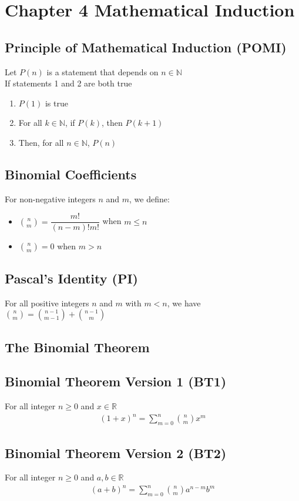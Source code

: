 \documentclass[12pt, letterpaper]{article}
\begin{document}
\section{Chapter 4 Mathematical Induction}
\subsection{Principle of Mathematical Induction (POMI)}
Let $P(n)$ is a statement that depends on $n \in \mathbb{N}$ \\
If statements 1 and 2 are both true 
\begin{enumerate}
    \item $P(1)$ is true 
    \item For all $k \in \mathbb{N}$, if $P(k)$, then $P(k+1)$
    \item Then, for all $n \in \mathbb{N}$, $P(n)$
\end{enumerate}
\subsection{Binomial Coefficients}
For non-negative integers $n$ and $m$, we define:
\begin{itemize}
    \item ${n \choose m} = \dfrac{m!}{(n-m)!m!}$ when $m \leq n$
    \item ${n \choose m} = 0$ when $m > n$
\end{itemize}
\subsection{Pascal's Identity (PI)}
For all positive integers $n$ and $m$ with $m < n$, we have \\
${n \choose m} = {{n-1} \choose {m-1}} + {{n-1} \choose m}$
\subsection{The Binomial Theorem}
\subsection{Binomial Theorem Version 1 (BT1)}
For all integer $n \geq 0$ and $x \in \mathbb{R}$
\begin{align*}
    (1+x)^n = \sum_{m=0}^{n} {n \choose m} x^m
\end{align*}
\subsection{Binomial Theorem Version 2 (BT2)}
For all integer $n \geq 0$ and $a,b \in \mathbb{R}$
\begin{align*}
    (a+b)^n = \sum_{m=0}^{n} {n \choose m} a^{n-m} b^m
\end{align*}
\end{document}
